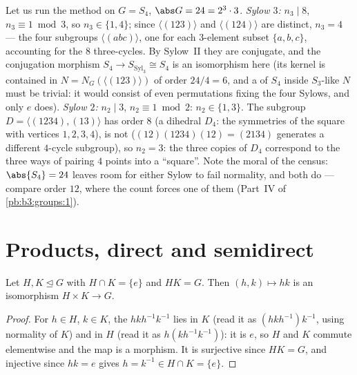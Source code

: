 \begin{example}
\label{ex:b3:groups:s4sylow}
Let us run the method on $G = S_4$, $\abs G = 24 = 2^3\cdot3$.
\emph{Sylow $3$:} $n_3 \mid 8$, $n_3 \equiv 1 \bmod 3$, so $n_3
\in \{1, 4\}$; since $\langle(123)\rangle$ and
$\langle(124)\rangle$ are distinct, $n_3 = 4$ --- the four
subgroups $\langle(abc)\rangle$, one for each $3$-element subset
$\{a, b, c\}$, accounting for the $8$ three-cycles. By Sylow~II
they are conjugate, and the conjugation morphism $S_4 \to
S_{\mathrm{Syl}_3} \cong S_4$ is an isomorphism here (its kernel
is contained in $N = N_G(\langle(123)\rangle)$ of order $24/4 =
6$, and a  of $S_4$ inside $S_3$-like $N$ must be
trivial: it would consist of even permutations fixing the four
Sylows, and only $e$ does). \emph{Sylow $2$:} $n_2 \mid 3$, $n_2
\equiv 1 \bmod 2$: $n_2 \in \{1, 3\}$. The subgroup $D =
\langle(1234), (13)\rangle$ has order $8$ (a dihedral $D_4$:
the symmetries of the square with vertices $1, 2, 3, 4$), is not
 ($(12)(1234)(12) = (2134)$ generates a different
$4$-cycle subgroup), so $n_2 = 3$: the three copies of $D_4$
correspond to the three ways of pairing $4$ points into a
``square''. Note the moral of the census: $\abs{S_4} = 24$
leaves room for either Sylow to fail normality, and both do ---
compare order $12$, where the count forces one of them 
(Part~IV of \cref{pb:b3:groups:1}).
\end{example}

\section{Products, direct and semidirect}

\begin{proposition}\label{prop:b3:groups:direct}
Let $H, K \trianglelefteq G$ with $H \cap K = \{e\}$ and $HK = G$.
Then $(h,k) \mapsto hk$ is an isomorphism $H \times K \to
G$.
\end{proposition}

\begin{proof}
For $h \in H$, $k \in K$, the  $hkh^{-1}k^{-1}$ lies in
$K$ (read it as $(hkh^{-1})k^{-1}$, using normality of $K$) and in
$H$ (read it as $h(kh^{-1}k^{-1})$): it is $e$, so $H$ and $K$
commute elementwise and the map is a morphism. It is surjective
since $HK = G$, and injective since $hk = e$ gives $h = k^{-1} \in
H \cap K = \{e\}$.
\end{proof}

